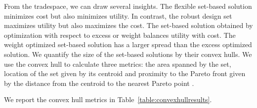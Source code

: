 From the tradespace, we can draw several insights. The flexible set-based solution minimizes cost but also minimizes utility. In contrast, the robust design set maximizes utility but also maximizes the cost. The set-based solution obtained by optimization with respect to excess or weight balances utility with cost. The weight optimized set-based solution has a larger spread than the excess optimized solution. We quantify the size of the set-based solutions by their convex hulls. We use the convex hull to calculate three metrics: the area spanned by the set, location of the set given by its centroid and proximity to the Pareto front given by the distance from the centroid to the nearest Pareto point \cite{Brown2019}.

We report the convex hull metrics in Table~\ref{table:convexhullresults}.

